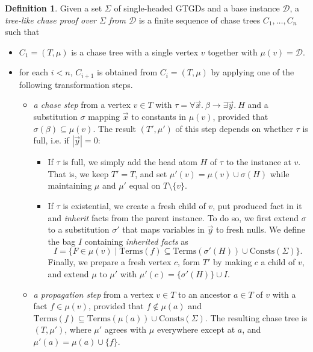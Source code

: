 \documentclass[12pt]{report}
\theoremstyle{plain}
\theoremstyle{definition}
\newtheorem{definition}[theorem]{Definition}
\def\Consts{{\mathrm{Consts}}}
\def\Terms{{\mathrm{Terms}}}
\begin{document}
\begin{definition}
\label{tree-like-chase-proof}
  Given a set $\Sigma$ of single-headed GTGDs and a base instance $\mathcal{D}$, a \emph{tree-like chase proof over $\Sigma$ from $\mathcal{D}$} is a finite sequence of chase trees $C_1, \ldots, C_n$ such that
  \begin{itemize}
    \item $C_1 = (T, \mu)$ is a chase tree with a single vertex $v$ together with $\mu(v) = \mathcal{D}$.
    \item for each $i < n$, $C_{i + 1}$ is obtained from $C_i = (T, \mu)$ by applying one of the following transformation steps.
    \begin{itemize}
      \item \emph{a chase step} from a vertex $v \in T$ with $\tau = \forall \vec{x}.\ \beta \rightarrow \exists \vec{y}.\ H$ and a substitution $\sigma$ mapping $\vec{x}$ to constants in $\mu(v)$, provided that $\sigma(\beta) \subseteq \mu(v)$. The result $(T', \mu')$ of this step depends on whether $\tau$ is full, i.e. if $|\vec{y}| = 0$:
      \begin{itemize}
        \item If $\tau$ is full, we simply add the head atom $H$ of $\tau$ to the instance at $v$. That is, we keep $T' = T$, and set $\mu'(v) = \mu(v) \cup \sigma(H)$ while maintaining $\mu$ and $\mu'$ equal on $T \setminus \{v\}$.
        \item If $\tau$ is existential, we create a fresh child of $v$, put produced fact in it and \emph{inherit} facts from the parent instance. To do so, we first extend $\sigma$ to a substitution $\sigma'$ that maps variables in $\vec{y}$ to fresh nulls. We define the bag $I$ containing \emph{inherited facts} as $$I = \{ F \in \mu(v) \mid \Terms(f) \subseteq \Terms(\sigma'(H)) \cup \Consts(\Sigma) \}.$$ Finally, we prepare a fresh vertex $c$, form $T'$ by making $c$ a child of $v$, and extend $\mu$ to $\mu'$ with $\mu'(c) = \{\sigma'(H)\} \cup I$.
      \end{itemize}
      \item \emph{a propagation step} from a vertex $v \in T$ to an ancestor $a \in T$ of $v$ with a fact $f \in \mu(v)$, provided that $f \not\in \mu(a)$ and $\Terms(f) \subseteq \Terms(\mu(a)) \cup \Consts(\Sigma)$. The resulting chase tree is $(T, \mu')$, where $\mu'$ agrees with $\mu$ everywhere except at $a$, and $\mu'(a) = \mu(a) \cup \{f\}$.
    \end{itemize}
  \end{itemize}
\end{definition}
\end{document}
